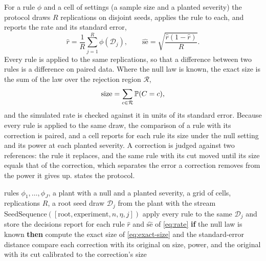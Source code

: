 For a rule $\phi$ and a cell of settings (a sample size and a planted severity) the protocol draws $R$ replications on disjoint seeds, applies the rule to each, and reports the rate and its standard error,
\begin{equation}
\hat r=\frac{1}{R}\sum_{j=1}^{R}\phi(\mathcal{D}_j),\qquad \widehat{\mathrm{se}}=\sqrt{\frac{\hat r(1-\hat r)}{R}}.
\label{eq:rate}
\end{equation}
Every rule is applied to the same replications, so that a difference between two rules is a difference on paired data. Where the null law is known, the exact size is the sum of the law over the rejection region $\mathcal{R}$,
\begin{equation}
\operatorname{size}=\sum_{c\in\mathcal{R}}\mathbb{P}(C=c),
\label{eq:exact-size}
\end{equation}
and the simulated rate is checked against it in units of its standard error. Because every rule is applied to the same draw, the comparison of a rule with its correction is paired, and a cell reports for each rule its size under the null setting and its power at each planted severity. A correction is judged against two references: the rule it replaces, and the same rule with its cut moved until its size equals that of the correction, which separates the error a correction removes from the power it gives up.  states the protocol.

\begin{algorithm}[htbp]
\caption{Measurement of the size and the power of a rule and of its correction.}
\label{alg:protocol}
\begin{algorithmic}[1]
\Require rules $\phi_1,\dots,\phi_J$, a plant with a null and a planted severity, a grid of cells, replications $R$, a root seed
    \State draw $\mathcal{D}_j$ from the plant with the stream $\mathrm{SeedSequence}([\text{root},\text{experiment},n,\eta,j])$
    \State apply every rule to the same $\mathcal{D}_j$ and store the decisions
  \EndFor
  \State report for each rule $\hat r$ and $\widehat{\mathrm{se}}$ of \cref{eq:rate}
  \State \textbf{if} the null law is known \textbf{then} compute the exact size of \cref{eq:exact-size} and the standard-error distance
\EndFor
\State compare each correction with its original on size, power, and the original with its cut calibrated to the correction's size
\end{algorithmic}
\end{algorithm}

